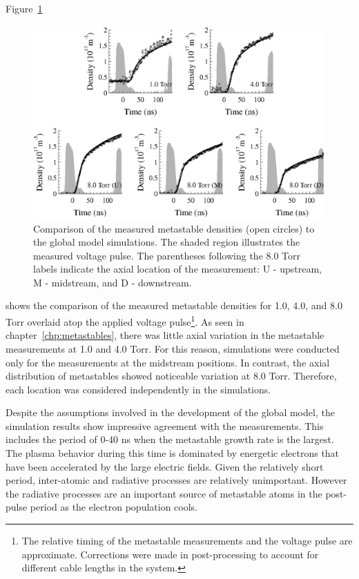 Figure~\ref{fig:nmcomp}
\begin{figure}
  \centering
  \includegraphics{./chapters/modeling/figures/nmcomp.eps}
  \caption{Comparison of the measured metastable densities (open circles) to
    the global model simulations. The shaded region illustrates the measured
    voltage pulse. The parentheses following the 8.0 Torr labels indicate the
    axial location of the measurement: U - upstream, M - midstream, and D -
    downstream.}
  \label{fig:nmcomp}
\end{figure}
shows the comparison of the measured metastable densities for 1.0, 4.0, and 8.0
Torr overlaid atop the applied voltage pulse\footnote{The relative timing of the
metastable measurements and the voltage pulse are approximate. Corrections were
made in post-processing to account for different cable lengths in the system.}.
As seen in chapter~\ref{chp:metastables}, there was little axial variation in
the metastable measurements at 1.0 and 4.0 Torr. For this reason, simulations
were conducted only for the measurements at the midstream positions. In
contrast, the axial distribution of metastables showed noticeable variation at
8.0 Torr. Therefore, each location was considered independently in the
simulations.

Despite the assumptions involved in the development of the global model, the
simulation results show impressive agreement with the measurements. This
includes the period of 0-40 ns when the metastable growth rate is the largest.
The plasma behavior during this time is dominated by energetic electrons that
have been accelerated by the large electric fields. Given the relatively short
period, inter-atomic and radiative processes are relatively unimportant. However
the radiative processes are an important source of metastable atoms in the
post-pulse period as the electron population cools.

